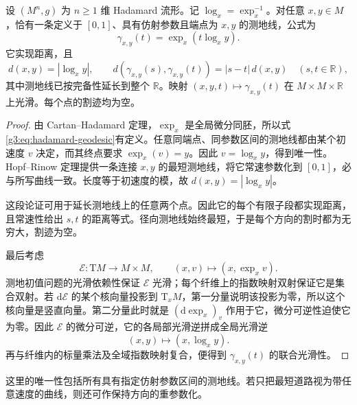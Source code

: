 \begin{proposition}\label{g3:prop:hadamard-geodesic-uniqueness}
	设 \((M^n,g)\) 为 \(n\ge1\) 维 Hadamard 流形。记 \(\log_x=\exp_x^{-1}\)。对任意 \(x,y\in M\)，恰有一条定义于 \([0,1]\)、具有仿射参数且端点为 \(x,y\) 的测地线，公式为
	\begin{equation}\label{g3:eq:hadamard-geodesic}
		\gamma_{x,y}(t)=\exp_x(t\log_x y).
	\end{equation}
	它实现距离，且
	\[
		d(x,y)=|\log_x y|,\qquad
		d(\gamma_{x,y}(s),\gamma_{x,y}(t))
		=|s-t|\,d(x,y)\quad(s,t\in\mathbb R),
	\]
	其中测地线已按完备性延长到整个 \(\mathbb R\)。映射 \((x,y,t)\mapsto\gamma_{x,y}(t)\) 在 \(M\times M\times\mathbb R\) 上光滑。每个点的割迹均为空。
\end{proposition}
\begin{proof}
	由 Cartan--Hadamard 定理，\(\exp_x\) 是全局微分同胚，所以式\eqref{g3:eq:hadamard-geodesic}有定义。任意同端点、同参数区间的测地线都由某个初速度 \(v\) 决定，而其终点要求 \(\exp_x(v)=y\)。因此 \(v=\log_x y\)，得到唯一性。Hopf--Rinow 定理提供一条连接 \(x,y\) 的最短测地线，将它常速参数化到 \([0,1]\)，必与所写曲线一致。长度等于初速度的模，故 \(d(x,y)=|\log_x y|\)。

	这段论证可用于延长测地线上的任意两个点。因此它的每个有限子段都实现距离，且常速性给出 \(s,t\) 的距离等式。径向测地线始终最短，于是每个方向的割时都为无穷大，割迹为空。

	最后考虑
	\[
		\mathcal E:\mathrm{T}M\longrightarrow M\times M,\qquad
		(x,v)\longmapsto(x,\exp_xv).
	\]
	测地初值问题的光滑依赖性保证 \(\mathcal E\) 光滑；每个纤维上的指数映射双射保证它是集合双射。若 \(\mathrm d\mathcal E\) 的某个核向量投影到 \(\mathrm{T}_xM\)，第一分量说明该投影为零，所以这个核向量是竖直向量。第二分量此时就是 \((\mathrm d\exp_x)_v\) 作用于它，微分可逆性迫使它为零。因此 \(\mathcal E\) 的微分可逆，它的各局部光滑逆拼成全局光滑逆
	\[
		(x,y)\longmapsto(x,\log_x y).
	\]
	再与纤维内的标量乘法及全域指数映射复合，便得到 \(\gamma_{x,y}(t)\) 的联合光滑性。
\end{proof}

这里的唯一性包括所有具有指定仿射参数区间的测地线。若只把最短道路视为带任意速度的曲线，则还可作保持方向的重参数化。


